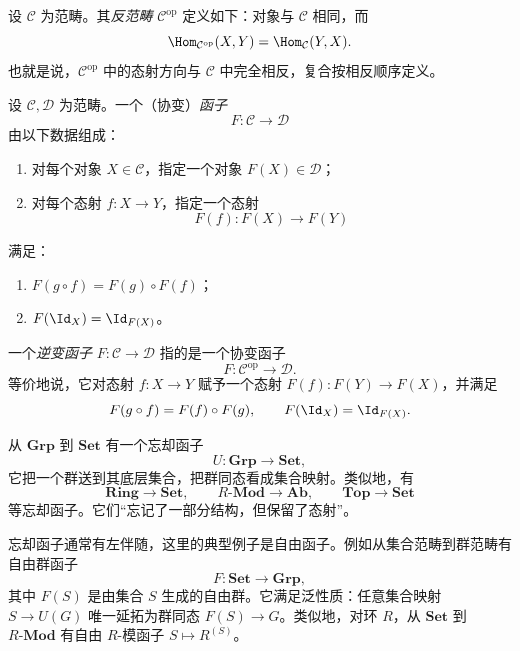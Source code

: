 \begin{definition}
设 $\mathcal C$ 为范畴。其\emph{反范畴} $\mathcal C^{\mathrm{op}}$ 定义如下：对象与 $\mathcal C$ 相同，而
\[
  \Hom_{\mathcal C^{\mathrm{op}}}(X,Y)
  =
  \Hom_{\mathcal C}(Y,X).
\]
也就是说，$\mathcal C^{\mathrm{op}}$ 中的态射方向与 $\mathcal C$ 中完全相反，复合按相反顺序定义。
\end{definition}

\begin{definition}
设 $\mathcal C,\mathcal D$ 为范畴。一个（协变）\emph{函子}
\[
  F\colon \mathcal C\longrightarrow \mathcal D
\]
由以下数据组成：
\begin{enumerate}[label=(\arabic*), leftmargin=2.5em]
  \item 对每个对象 $X\in \mathcal C$，指定一个对象 $F(X)\in \mathcal D$；
  \item 对每个态射 $f\colon X\to Y$，指定一个态射
  \[
    F(f)\colon F(X)\to F(Y)
  \]
\end{enumerate}
满足：
\begin{enumerate}[label=(\roman*), leftmargin=2.5em]
  \item $F(g\circ f)=F(g)\circ F(f)$；
  \item $F(\Id_X)=\Id_{F(X)}$。
\end{enumerate}

一个\emph{逆变函子} $F\colon \mathcal C\to \mathcal D$ 指的是一个协变函子
\[
  F\colon \mathcal C^{\mathrm{op}}\longrightarrow \mathcal D.
\]
等价地说，它对态射 $f\colon X\to Y$ 赋予一个态射 $F(f)\colon F(Y)\to F(X)$，并满足
\[
  F(g\circ f)=F(f)\circ F(g),
  \qquad
  F(\Id_X)=\Id_{F(X)}.
\]
\end{definition}

\begin{example}[忘却函子]
从 $\mathbf{Grp}$ 到 $\mathbf{Set}$ 有一个忘却函子
\[
  U\colon \mathbf{Grp}\to \mathbf{Set},
\]
它把一个群送到其底层集合，把群同态看成集合映射。类似地，有
\[
  \mathbf{Ring}\to \mathbf{Set},
  \qquad
  R\text{-}\mathbf{Mod}\to \mathbf{Ab},
  \qquad
  \mathbf{Top}\to \mathbf{Set}
\]
等忘却函子。它们“忘记了一部分结构，但保留了态射”。
\end{example}

\begin{example}[自由函子]
忘却函子通常有左伴随，这里的典型例子是自由函子。例如从集合范畴到群范畴有自由群函子
\[
  F\colon \mathbf{Set}\to \mathbf{Grp},
\]
其中 $F(S)$ 是由集合 $S$ 生成的自由群。它满足泛性质：任意集合映射 $S\to U(G)$ 唯一延拓为群同态 $F(S)\to G$。类似地，对环 $R$，从 $\mathbf{Set}$ 到 $R\text{-}\mathbf{Mod}$ 有自由 $R$-模函子 $S\mapsto R^{(S)}$。
\end{example}


